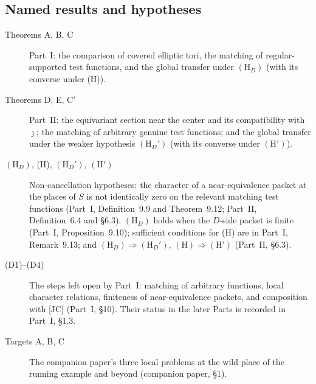 \subsection{Named results and hypotheses}\label{gl:named}
\begin{description}
\item[Theorems A, B, C] Part~I: the comparison of covered elliptic
tori, the matching of regular-supported test functions, and the
global transfer under $(\mathrm H_D)$ (with its converse under (H)).
\item[Theorems D, E, C$'$] Part~II: the equivariant section near the
center and its compatibility with $\jmath$; the matching of arbitrary
genuine test functions; and the global transfer under the weaker
hypothesis $(\mathrm H_D')$ (with its converse under $(\mathrm H')$).
\item[$(\mathrm H_D)$, (H), $(\mathrm H_D')$, $(\mathrm H')$]
Non-cancellation hypotheses: the character of a near-equivalence
packet at the places of $S$ is not identically zero on the relevant
matching test functions (Part~I, Definition~9.9 and
Theorem~9.12; Part~II, Definition~6.4 and \S6.3).  $(\mathrm H_D)$
holds when the $D$-side packet is finite (Part~I,
Proposition~9.10); sufficient conditions for (H) are in Part~I,
Remark~9.13; and $(\mathrm H_D)\Rightarrow(\mathrm H_D')$,
$(\mathrm H)\Rightarrow(\mathrm H')$ (Part~II, \S6.3).
\item[(D1)--(D4)] The steps left open by Part~I: matching of
arbitrary functions, local character relations, finiteness of
near-equivalence packets, and composition with [JC] (Part~I, \S10).
Their status in the later Parts is recorded in Part~I, \S1.3.
\item[Targets A, B, C] The companion paper's three local problems at
the wild place of the running example and beyond (companion paper,
\S1).
\end{description}
